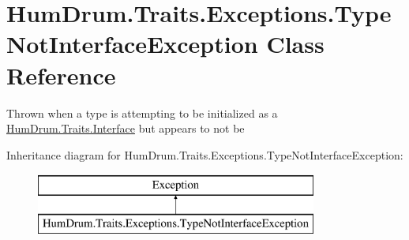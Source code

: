 \hypertarget{classHumDrum_1_1Traits_1_1Exceptions_1_1TypeNotInterfaceException}{}\section{Hum\+Drum.\+Traits.\+Exceptions.\+Type\+Not\+Interface\+Exception Class Reference}
\label{classHumDrum_1_1Traits_1_1Exceptions_1_1TypeNotInterfaceException}


Thrown when a type is attempting to be initialized as a \hyperlink{classHumDrum_1_1Traits_1_1Interface}{Hum\+Drum.\+Traits.\+Interface} but appears to not be  


Inheritance diagram for Hum\+Drum.\+Traits.\+Exceptions.\+Type\+Not\+Interface\+Exception\+:\begin{figure}[H]
\begin{center}
\leavevmode
\includegraphics[height=2.000000cm]{classHumDrum_1_1Traits_1_1Exceptions_1_1TypeNotInterfaceException}
\end{center}
\end{figure}
